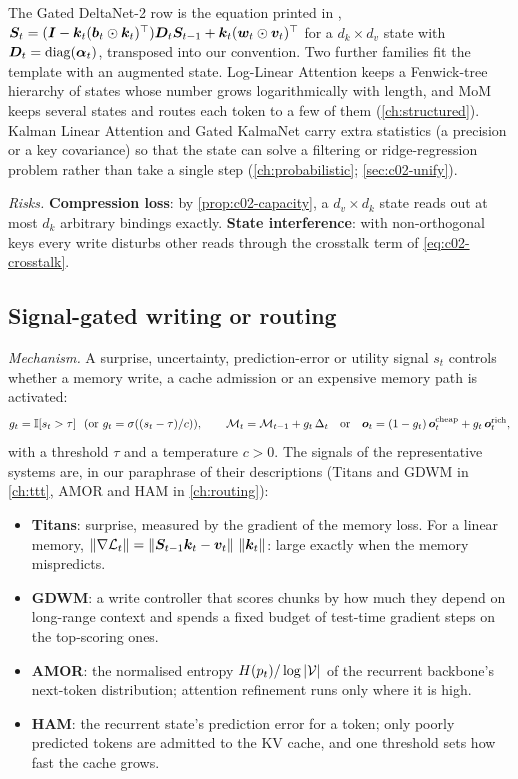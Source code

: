 The Gated DeltaNet-2 row is the equation printed in
,
$\bm{S}_t = (\bm{I} - \bm{k}_t(\bm{b}_t\odot\bm{k}_t)^{\top})\bm{D}_t\bm{S}_{t-1} + \bm{k}_t(\bm{w}_t\odot\bm{v}_t)^{\top}$ for a
$d_k\times d_v$ state with $\bm{D}_t = \operatorname{diag}(\bm{\alpha}_t)$, transposed into our convention. Two further
families fit the template with an augmented state. Log-Linear Attention keeps a Fenwick-tree
hierarchy of states whose number grows logarithmically with length, and MoM keeps several states
and routes each token to a few of them (\cref{ch:structured}). Kalman Linear Attention and Gated
KalmaNet carry extra statistics (a precision or a key covariance) so that the state can solve a
filtering or ridge-regression problem rather than take a single step (\cref{ch:probabilistic};
\cref{sec:c02-unify}).

\emph{Risks.} \textbf{Compression loss}: by \cref{prop:c02-capacity}, a $d_v\times d_k$ state reads
out at most $d_k$ arbitrary bindings exactly. \textbf{State interference}: with non-orthogonal keys
every write disturbs other reads through the crosstalk term of \eqref{eq:c02-crosstalk}.

\subsection{Signal-gated writing or routing}\label{sec:c02-rule-gate}

\emph{Mechanism.} A surprise, uncertainty, prediction-error or utility signal $s_t$ controls
whether a memory write, a cache admission or an expensive memory path is activated:
\begin{equation}\label{eq:c02-gate}
  g_t = \mathbb{I}[s_t > \tau]\ \ \text{(or } g_t = \sigma((s_t - \tau)/c)\text{)},\qquad
  \mathcal{M}_t = \mathcal{M}_{t-1} + g_t\,\Delta_t
  \quad\text{or}\quad
  \bm{o}_t = (1-g_t)\,\bm{o}^{\mathrm{cheap}}_t + g_t\,\bm{o}^{\mathrm{rich}}_t ,
\end{equation}
with a threshold $\tau$ and a temperature $c > 0$. The signals of the representative systems
are, in our paraphrase of their descriptions (Titans and GDWM in \cref{ch:ttt}, AMOR and HAM in
\cref{ch:routing}):
\begin{itemize}
  \item \textbf{Titans}: surprise, measured by the gradient of the memory loss. For a linear
        memory, $\left\lVert \nabla\mathcal{L}_t\right\rVert = \left\lVert \bm{S}_{t-1}\bm{k}_t - \bm{v}_t\right\rVert\,\left\lVert \bm{k}_t\right\rVert$: large exactly
        when the memory mispredicts.
  \item \textbf{GDWM}: a write controller that scores chunks by how much they depend on long-range
        context and spends a fixed budget of test-time gradient steps on the top-scoring ones.
  \item \textbf{AMOR}: the normalised entropy $H(p_t)/\log\left\lvert \mathcal{V}\right\rvert$ of the recurrent
        backbone's next-token distribution; attention refinement runs only where it is high.
  \item \textbf{HAM}: the recurrent state's prediction error for a token; only poorly predicted
        tokens are admitted to the KV cache, and one threshold sets how fast the cache grows.
\end{itemize}

